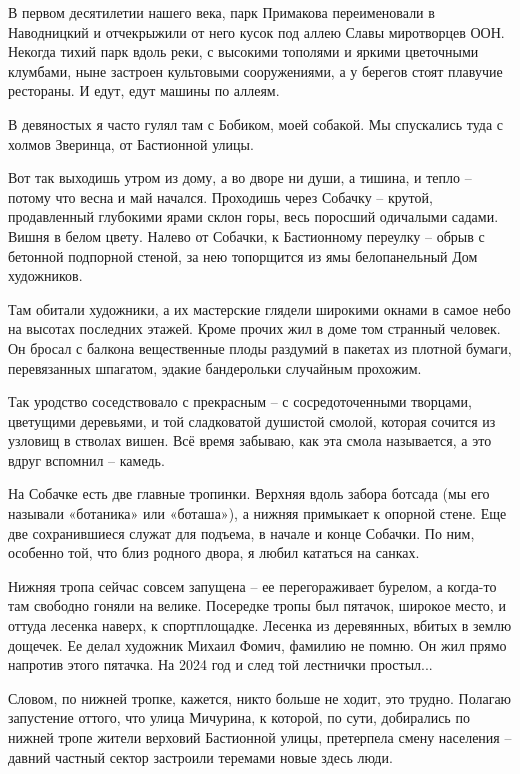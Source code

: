 В первом десятилетии нашего века, парк Примакова переименовали в Наводницкий и отчекрыжили от него кусок под аллею Славы миротворцев ООН. Некогда тихий парк вдоль реки, с высокими тополями и яркими цветочными клумбами, ныне застроен культовыми сооружениями, а у берегов стоят плавучие рестораны. И едут, едут машины по аллеям.

В девяностых я часто гулял там с Бобиком, моей собакой. Мы спускались туда с холмов Зверинца, от Бастионной улицы.

Вот так выходишь утром из дому, а во дворе ни души, а тишина, и тепло – потому что весна и май начался. Проходишь через Собачку – крутой, продавленный глубокими ярами склон горы, весь поросший одичалыми садами. Вишня в белом цвету. Налево от Собачки, к Бастионному переулку – обрыв с бетонной подпорной стеной, за нею топорщится из ямы белопанельный Дом художников.

Там обитали художники, а их мастерские глядели широкими окнами в самое небо на высотах последних этажей. Кроме прочих жил в доме том странный человек. Он бросал с балкона вещественные плоды раздумий в пакетах из плотной бумаги, перевязанных шпагатом, эдакие бандерольки случайным прохожим.

Так уродство соседствовало с прекрасным – с сосредоточенными творцами, цветущими деревьями, и той сладковатой душистой смолой, которая сочится из узловищ в стволах вишен. Всё время забываю, как эта смола называется, а это вдруг вспомнил – камедь.

На Собачке есть две главные тропинки. Верхняя вдоль забора ботсада (мы его называли «ботаника» или «боташа»), а нижняя примыкает к опорной стене. Еще две сохранившиеся служат для подъема, в начале и конце Собачки. По ним, особенно той, что близ родного двора, я любил кататься на санках.

Нижняя тропа сейчас совсем запущена – ее перегораживает бурелом, а когда-то там свободно гоняли на велике. Посередке тропы был пятачок, широкое место, и оттуда лесенка наверх, к спортплощадке. Лесенка из деревянных, вбитых в землю дощечек. Ее делал художник Михаил Фомич, фамилию не помню. Он жил прямо напротив этого пятачка. На 2024 год и след той лестнички простыл...

Словом, по нижней тропке, кажется, никто больше не ходит, это трудно. Полагаю запустение оттого, что улица Мичурина, к которой, по сути, добирались по нижней тропе жители верховий Бастионной улицы, претерпела смену населения – давний частный сектор застроили теремами новые здесь люди.

